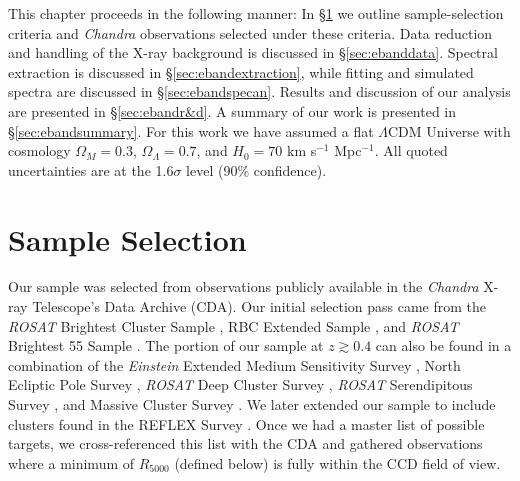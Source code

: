 This chapter proceeds in the following manner: In \S\ref{sec:ebandselection}
we outline sample-selection criteria and {\it Chandra} observations
selected under these criteria. Data reduction and handling of the
X-ray background is discussed in \S\ref{sec:ebanddata}. Spectral extraction
is discussed in \S\ref{sec:ebandextraction}, while fitting and simulated
spectra are discussed in \S\ref{sec:ebandspecan}. Results and discussion of
our analysis are presented in \S\ref{sec:ebandr&d}. A summary of our work
is presented in \S\ref{sec:ebandsummary}. For this work we have assumed a
flat $\Lambda$CDM Universe with cosmology $\Omega_{M} = 0.3$,
$\Omega_{\Lambda} = 0.7$, and $H_{0} = 70$ km s$^{-1}$ Mpc$^{-1}$. All
quoted uncertainties are at the 1.6$\sigma$ level (90\% confidence).

\section{Sample Selection}
\label{sec:ebandselection}

Our sample was selected from observations publicly available in the
{\it Chandra} X-ray Telescope's Data Archive (CDA). Our initial
selection pass came from the {\it{ROSAT}} Brightest Cluster Sample
\citep{1998MNRAS.301..881E}, RBC Extended Sample
\citep{2000MNRAS.318..333E}, and {\it{ROSAT}} Brightest 55 Sample
\citep{1990MNRAS.245..559E, 1998MNRAS.298..416P}. The portion of our
sample at $z \gtrsim 0.4$ can also be found in a combination of the
{\it{Einstein}} Extended Medium Sensitivity Survey
\citep{1990ApJS...72..567G}, North Ecliptic Pole Survey
\citep{2006ApJS..162..304H}, {\it{ROSAT}} Deep Cluster Survey
\citep{1995ApJ...445L..11R}, {\it{ROSAT}} Serendipitous Survey
\citep{1998ApJ...502..558V}, and Massive Cluster Survey
\citep{2001ApJ...553..668E}. We later extended our sample to include
clusters found in the REFLEX Survey \citep{reflex}. Once we had a
master list of possible targets, we cross-referenced this list with
the CDA and gathered observations where a minimum of $R_{5000}$
(defined below) is fully within the CCD field of view.

